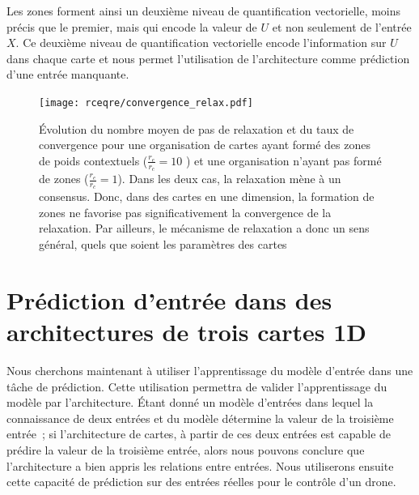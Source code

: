 \documentclass[../main]{subfiles}
\begin{document}
Les zones forment ainsi un deuxième niveau de quantification vectorielle, moins précis que le premier, mais qui encode la valeur de $U$ et non seulement de l'entrée $X$. 
Ce deuxième niveau de quantification vectorielle encode l'information sur $U$ dans chaque carte et nous permet l'utilisation de l'architecture comme prédiction d'une entrée manquante.

\begin{figure}
	\texttt{[image: rceqre/convergence\_relax.pdf]}
	\caption{\'Evolution du nombre moyen de pas de relaxation et du taux de convergence pour une organisation de cartes ayant formé des zones de poids contextuels ($\frac{r_e}{r_c} = 10$ ) et une organisation n'ayant pas formé de zones ($\frac{r_e}{r_c} = 1$). Dans les deux cas, la relaxation mène à un consensus. 
	Donc, dans des cartes en une dimension, la formation de zones ne favorise pas significativement la convergence de la relaxation. Par ailleurs, le mécanisme de relaxation a donc un sens général, quels que soient les paramètres des cartes \label{fig:conv_rcre}}
\end{figure}

\section{Prédiction d'entrée dans des architectures de trois cartes 1D}


Nous cherchons maintenant à utiliser l'apprentissage du modèle d'entrée dans une tâche de prédiction. Cette utilisation permettra de valider l'apprentissage du modèle par l'architecture. \'Etant donné un modèle d'entrées dans lequel la connaissance de deux entrées et du modèle détermine la valeur de la troisième entrée~; si l'architecture de cartes, à partir de ces deux entrées est capable de prédire la valeur de la troisième entrée, alors nous pouvons conclure que l'architecture a bien appris les relations entre entrées. 
Nous utiliserons ensuite cette capacité de prédiction sur des entrées réelles pour le contrôle d'un drone.
\end{document}
